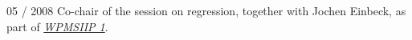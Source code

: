 \documentclass[a4paper]{simplecv}
\begin{document}
\begin{topic}
\item[05 / 2008] Co-chair of the session on regression, together with Jochen Einbeck,
                 as part of \emph{\href{http://www.maths.dur.ac.uk/users/matthias.troffaes/workshopip2008/index.html}{WPMSIIP 1}}.
\end{topic}






\renewcommand\refname{List of publications}
\label{publications}

%
\end{document}
